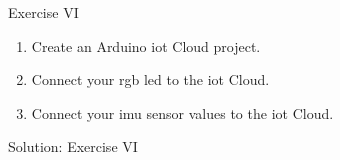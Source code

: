 \begin{frame}
    \begin{exampleblock}{Exercise VI}
        \begin{enumerate}
            \item Create an Arduino\textregistered{} \acs{iot} Cloud project.
            \item Connect your \acs{rgb} \acs{led} to the \acs{iot} Cloud.
            \item Connect your \acs{imu} sensor values to the \acs{iot} Cloud.
        \end{enumerate}
    \end{exampleblock}
\end{frame}

\begin{frame}{Solution: Exercise VI}
\end{frame}